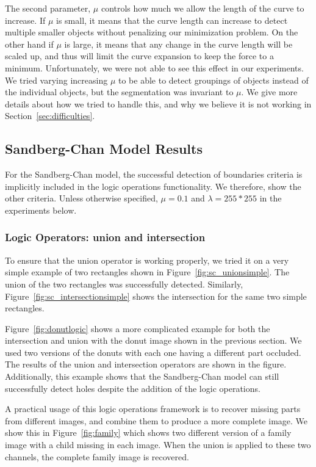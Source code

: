 \documentclass[10pt,twocolumn,letterpaper]{article}
\begin{document}
The second parameter, $\mu$ controls how much we allow the length of the curve to increase. If $\mu$ is small, it means that the curve length can increase to
detect multiple smaller objects without penalizing our minimization problem. On the other hand if $\mu$ is large, it means that any change in the curve length
will be scaled up, and thus will limit the curve expansion to keep the force to a minimum. Unfortunately, we were not able to see this effect in our
experiments. We tried varying increasing $\mu$ to be able to detect groupings of objects instead of the individual objects, but the segmentation was invariant
to $\mu$. We give more details about how we tried to handle this, and why we believe it is not working in Section~\ref{sec:difficulties}.

\subsection{Sandberg-Chan Model Results}

For the Sandberg-Chan model, the successful detection of boundaries criteria is implicitly included in the logic operations functionality. We therefore, show
the other criteria. Unless otherwise specified, $\mu = 0.1$ and $\lambda = 255*255$ in the experiments below.


\subsubsection*{Logic Operators: union and intersection}

To ensure that the union operator is working properly, we tried it on a very simple example of two rectangles shown in Figure~\ref{fig:sc_unionsimple}. The
union of the two rectangles was successfully detected. Similarly, Figure~\ref{fig:sc_intersectionsimple} shows the intersection for the same two simple
rectangles. 

Figure~\ref{fig:donutlogic} shows a more complicated example for both the intersection and union with the donut image shown in the previous section. We used
two versions of the donuts with each one having a different part occluded. The results of the union and intersection operators are shown in the figure.
Additionally, this example shows that the Sandberg-Chan model can still successfully detect holes despite the addition of the logic operations.

A practical usage of this logic operations framework is to recover missing parts from different images, and combine them to produce a more complete image. We
show this in Figure~\ref{fig:family} which shows two different version of a family image with a child missing in each image. When the union is applied to these
two channels, the complete family image is recovered.
\end{document}
